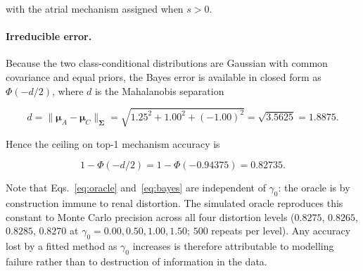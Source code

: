 with the atrial mechanism assigned when $s > 0$.

\paragraph{Irreducible error.}
Because the two class-conditional distributions are Gaussian with common
covariance and equal priors, the Bayes error is available in closed form as
$\Phi(-d/2)$, where $d$ is the Mahalanobis separation

\begin{equation}
  d = \big\lVert \bm{\mu}_A - \bm{\mu}_C \big\rVert_{\bm{\Sigma}}
    = \sqrt{1.25^2 + 1.00^2 + (-1.00)^2}
    = \sqrt{3.5625}
    = 1.8875 .
  \label{eq:separation}
\end{equation}

Hence the ceiling on top-1 mechanism accuracy is

\begin{equation}
  1 - \Phi(-d/2) = 1 - \Phi(-0.94375) = 0.82735 .
  \label{eq:bayes}
\end{equation}

Note that Eqs.~\eqref{eq:oracle} and~\eqref{eq:bayes} are independent of
$\gamma_0$: the oracle is by construction immune to renal distortion. The
simulated oracle reproduces this constant to Monte Carlo precision across all
four distortion levels ($0.8275$, $0.8265$, $0.8285$, $0.8270$ at
$\gamma_0 = 0.00, 0.50, 1.00, 1.50$; $500$ repeats per level). Any accuracy lost
by a fitted method as $\gamma_0$ increases is therefore attributable to
modelling failure rather than to destruction of information in the data.
